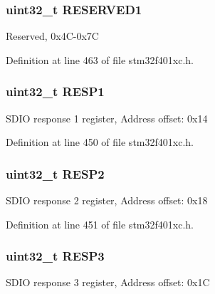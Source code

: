 \subsubsection[{\texorpdfstring{R\+E\+S\+E\+R\+V\+E\+D1}{RESERVED1}}]{\setlength{\rightskip}{0pt plus 5cm}uint32\+\_\+t R\+E\+S\+E\+R\+V\+E\+D1}\hypertarget{struct_s_d_i_o___type_def_a7de5924e16c39a869739dbb174f62fce}{}\label{struct_s_d_i_o___type_def_a7de5924e16c39a869739dbb174f62fce}
Reserved, 0x4\+C-\/0x7C 

Definition at line 463 of file stm32f401xc.\+h.

\subsubsection[{\texorpdfstring{R\+E\+S\+P1}{RESP1}}]{ uint32\+\_\+t R\+E\+S\+P1}\hypertarget{struct_s_d_i_o___type_def_a7b0ee0dc541683266dfab6335abca891}{}\label{struct_s_d_i_o___type_def_a7b0ee0dc541683266dfab6335abca891}
S\+D\+IO response 1 register, Address offset\+: 0x14 

Definition at line 450 of file stm32f401xc.\+h.

\subsubsection[{\texorpdfstring{R\+E\+S\+P2}{RESP2}}]{ uint32\+\_\+t R\+E\+S\+P2}\hypertarget{struct_s_d_i_o___type_def_a4d99c78dffdb6e81e8f6b7abec263419}{}\label{struct_s_d_i_o___type_def_a4d99c78dffdb6e81e8f6b7abec263419}
S\+D\+IO response 2 register, Address offset\+: 0x18 

Definition at line 451 of file stm32f401xc.\+h.

\subsubsection[{\texorpdfstring{R\+E\+S\+P3}{RESP3}}]{ uint32\+\_\+t R\+E\+S\+P3}\hypertarget{struct_s_d_i_o___type_def_a3da04fbdd44f48a1840e5e0a6295f3cf}{}\label{struct_s_d_i_o___type_def_a3da04fbdd44f48a1840e5e0a6295f3cf}
S\+D\+IO response 3 register, Address offset\+: 0x1C 

